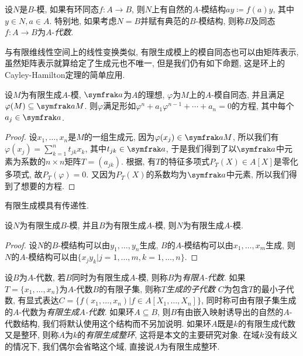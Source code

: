 设$N$是$B$-模, 如果有环同态$f\colon A\to B$, 则$N$上有自然的$A$-模结构$ay\coloneq f(a)y$, 其中$y\in N, a\in A$. 特别地, 如果考虑$N=B$并赋有典范的$B$-模结构, 则称$B$及同态$f\colon A\to B$为$A$-\emph{代数}.

与有限维线性空间上的线性变换类似, 有限生成模上的模自同态也可以由矩阵表示, 虽然矩阵表示就算给定了生成元也不唯一, 但是我们仍有如下命题, 这是环上的Cayley-Hamilton定理的简单应用.

\begin{proposition}\label{prop:fgmoduleendomorphism}
  设$M$为有限生成$A$-模, $\ideal{a}$为$A$的理想, $\varphi$为$M$上的$A$-模自同态, 并且满足$\varphi(M)\subseteq \ideal{a}M$. 则$\varphi$满足形如$\varphi^n+a_1\varphi^{n-1}+\dotsb +a_n=0$的方程, 其中每个$a_j\in \ideal{a}$.
\end{proposition}

\begin{proof}
  设$x_1, \dotsc, x_n$是$M$的一组生成元, 因为$\varphi (x_j)\in \ideal{a}M$, 所以我们有$\varphi (x_j)=\sum_{k=1}^n t_{jk}x_k$, 其中$t_{jk}\in \ideal{a}$, 于是我们得到了以$\ideal{a}$中元素为系数的$n\times n$矩阵$T=(a_{jk})$. 根据, 有$T$的特征多项式$P_T(X)\in A[X]$是零化多项式, 故$P_T(\varphi)=0$. 又因为$P_T(X)$的系数均为$\ideal{a}$中元素, 所以我们得到了想要的方程.
\end{proof}

有限生成模具有传递性.

\begin{proposition}\label{prop:fgmodule}
  设$N$为有限生成$B$-模, 并且$B$为有限生成$A$-模, 则$N$为有限生成$A$-模.
\end{proposition}

\begin{proof}
  设$N$的$B$-模结构可以由$y_1, \dotsc, y_n$生成, $B$的$A$-模结构可以由$x_1, \dotsc, x_m$生成, 则$N$的$A$-模结构可以由$\{x_jy_k\vert j=1, \dotsc, m, k=1, \dotsc, n\}$.
\end{proof}

\begin{definition}
  设$B$为$A$-代数, 若$B$同时为有限生成$A$-模, 则称$B$为\emph{有限$A$-代数}. 如果$T=\{x_1, \dotsc, x_n\}$为$A$-代数$B$的有限子集, 则称$T$\emph{生成的子代数} $C$为包含$T$的最小子代数, 有显式表达$C=\{f(x_1, \dotsc, x_n)\vert f\in A[X_1, \dotsc, X_n]\}$,
  同时称可由有限子集生成的$A$-代数为\emph{有限生成$A$-代数}. 如果环$A\subseteq B$, 则$B$有由嵌入映射诱导出的自然的$A$-代数结构, 我们将默认使用这个结构而不另加说明. 如果环$A$既是$k$的有限生成代数又是整环, 则称$A$为$k$的\emph{有限生成整环}, 这将是本文的主要研究对象. 在域$k$没有歧义的情况下, 我们偶尔会省略这个域, 直接说$A$为有限生成整环.
\end{definition}

